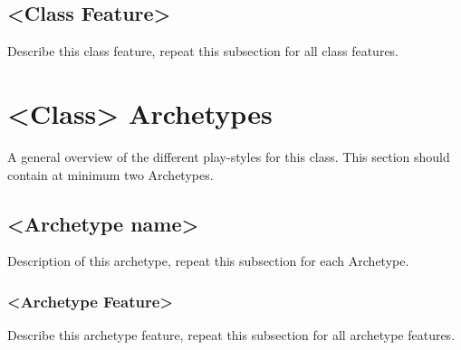 \subsection{<Class Feature>}
Describe this class feature, repeat this subsection for all class features.

\section*{<Class> Archetypes}

A general overview of the different play-styles for this class. This section should contain at minimum two Archetypes.

\subsection{<Archetype name>}
 Description of this archetype, repeat this subsection for each Archetype.
 
 \subsubsection{<Archetype Feature>}
Describe this archetype feature, repeat this subsection for all archetype features.
